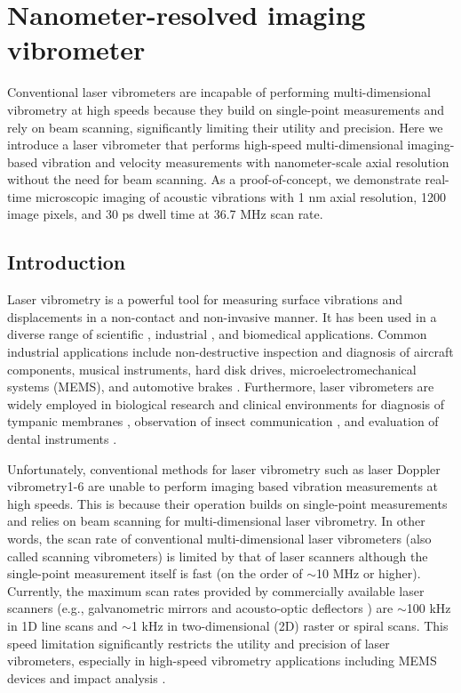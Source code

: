 \chapter{Nanometer-resolved imaging vibrometer}

Conventional laser vibrometers are incapable of performing multi-dimensional vibrometry at high speeds because they build on single-point measurements and rely on beam scanning, significantly limiting their utility and precision. Here we introduce a laser vibrometer that performs high-speed multi-dimensional imaging-based vibration and velocity measurements with nanometer-scale axial resolution without the need for beam scanning. As a proof-of-concept, we demonstrate real-time microscopic imaging of acoustic vibrations with 1 nm axial resolution, 1200 image pixels, and 30 ps dwell time at 36.7 MHz scan rate.

\section{Introduction}

Laser vibrometry is a powerful tool for measuring surface vibrations and displacements in a non-contact and non-invasive manner. It has been used in a diverse range of scientific \cite{castellini2006laser,broch1980mechanical}, industrial \cite{castellini2006laser,broch1980mechanical,drain1980laser,arnott1990laser}, and biomedical \cite{castellini2006laser,drain1980laser,goode1996laser,huber2001evaluation} applications. Common industrial applications include non-destructive inspection and diagnosis of aircraft components, musical instruments, hard disk drives, microelectromechanical systems (MEMS), and automotive brakes \cite{castellini2006laser,broch1980mechanical,drain1980laser}. Furthermore, laser vibrometers are widely employed in biological research and clinical environments for diagnosis of tympanic membranes \cite{goode1996laser,huber2001evaluation}, observation of insect communication \cite{castellini2006laser,drain1980laser}, and evaluation of dental instruments \cite{castellini2006laser,drain1980laser}.

Unfortunately, conventional methods for laser vibrometry such as laser Doppler vibrometry1-6 are unable to perform imaging based vibration measurements at high speeds. This is because their operation builds on single-point measurements and relies on beam scanning for multi-dimensional laser vibrometry. In other words, the scan rate of conventional multi-dimensional laser vibrometers (also called scanning vibrometers) is limited by that of laser scanners although the single-point measurement itself is fast (on the order of $\sim$10 MHz or higher). Currently, the maximum scan rates provided by commercially available laser scanners (e.g., galvanometric mirrors \cite{conant2002micromachined} and acousto-optic deflectors \cite{pape1994design}) are $\sim$100 kHz in 1D line scans and $\sim$1 kHz in two-dimensional (2D) raster or spiral scans. This speed limitation significantly restricts the utility and precision of laser vibrometers, especially in high-speed vibrometry applications including MEMS devices and impact analysis \cite{castellini2006laser,broch1980mechanical,drain1980laser}.

